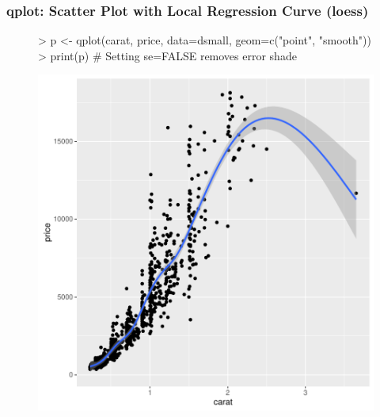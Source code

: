 \documentclass{beamer}
\begin{document}
\begin{frame}[containsverbatim]  
	\frametitle{qplot: Scatter Plot with Local Regression Curve (loess)}
\scriptsize 
\begin{figure}
  \centering
\begin{Schunk}
\begin{Sinput}
> p <- qplot(carat, price, data=dsmall, geom=c("point", "smooth")) 
> print(p) # Setting se=FALSE removes error shade
\end{Sinput}
\end{Schunk}
\includegraphics{fig--038}
\label{fig:qplotscatter}
\end{figure}
\end{frame}
\end{document}
